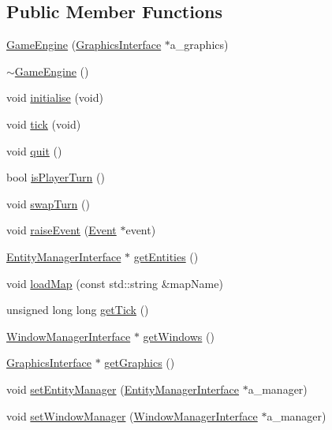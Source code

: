 \subsection*{Public Member Functions}
\begin{DoxyCompactItemize}
\item 
\hyperlink{classGameEngine_a24a61ae50e4acd529abf6db0e07a732b}{Game\-Engine} (\hyperlink{classGraphicsInterface}{Graphics\-Interface} $\ast$a\-\_\-graphics)
\item 
\hyperlink{classGameEngine_a8e59d8341ef9d2dcc62eee1437e37f14}{$\sim$\-Game\-Engine} ()
\item 
void \hyperlink{classGameEngine_a6b4efc1f1d83f8c54c9f51f083705b81}{initialise} (void)
\item 
void \hyperlink{classGameEngine_a1df5865f2b074ef0fc68e6438b2fa265}{tick} (void)
\item 
void \hyperlink{classGameEngine_ad82b626def2e52b28f0d6c2d167589f6}{quit} ()
\item 
bool \hyperlink{classGameEngine_a789635fa84c65458455506ef54285b19}{is\-Player\-Turn} ()
\item 
void \hyperlink{classGameEngine_aa6181abb92ead7a904649fa03742caab}{swap\-Turn} ()
\item 
void \hyperlink{classGameEngine_af8db59fc46f510d9f6fd93c129b32a30}{raise\-Event} (\hyperlink{classEvent}{Event} $\ast$event)
\item 
\hyperlink{classEntityManagerInterface}{Entity\-Manager\-Interface} $\ast$ \hyperlink{classGameEngine_abb290b49ef61faec60a4960ac9df4303}{get\-Entities} ()
\item 
void \hyperlink{classGameEngine_a6116c0b6acf3ed29b7020f1df9b69403}{load\-Map} (const std\-::string \&map\-Name)
\item 
unsigned long long \hyperlink{classGameEngine_a0be043b34ca2bae3734e025f9d3f0bf0}{get\-Tick} ()
\item 
\hyperlink{classWindowManagerInterface}{Window\-Manager\-Interface} $\ast$ \hyperlink{classGameEngine_a28923eb5e29aac5f9541ca4af1ed17c3}{get\-Windows} ()
\item 
\hyperlink{classGraphicsInterface}{Graphics\-Interface} $\ast$ \hyperlink{classGameEngine_a602659da54f2d3fd5f3df555d22da2bc}{get\-Graphics} ()
\item 
void \hyperlink{classGameEngine_a014c9925928164befd6aa03d6bc21dbc}{set\-Entity\-Manager} (\hyperlink{classEntityManagerInterface}{Entity\-Manager\-Interface} $\ast$a\-\_\-manager)
\item 
void \hyperlink{classGameEngine_a27773808b06416c54beb52069c966a3b}{set\-Window\-Manager} (\hyperlink{classWindowManagerInterface}{Window\-Manager\-Interface} $\ast$a\-\_\-manager)

\end{DoxyCompactItemize}
